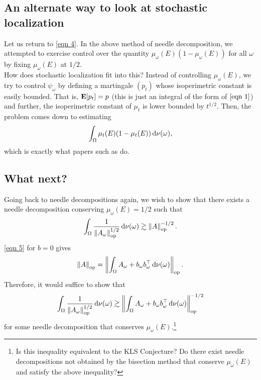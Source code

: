 \documentclass{article}
\begin{document}
	\subsection{An alternate way to look at stochastic localization}

		Let us return to \eqref{eqn 4}. In the above method of needle decomposition, we attempted to exercise control over the quantity $\mu_\omega(E) ( 1 - \mu_\omega(E) )$ for all $\omega$ by fixing $\mu_\omega(E)$ at $1/2$.\\

		How does stochastic localization fit into this? Instead of controlling $\mu_\omega(E)$, we try to control $\psi_\omega$ by defining a martingale $(p_t)$ whose isoperimetric constant is easily bounded. That is, $\textbf{E}[p_t] = p$ (this is just an integral of the form of $\eqref{eqn 1}$) and further, the isoperimetric constant of $\mu_t$ is lower bounded by $t^{1/2}$. Then, the problem comes down to estimating
		\[ \int_\Omega \mu_t(E) ( 1 - \mu_t(E) ) \operatorname{d}\!{\nu(\omega)}, \]
	which is exactly what papers such as \cite{chen2021constant} do.

	\subsection{What next?}

		Going back to needle decompositions again, we wish to show that there exists a needle decomposition conserving $\mu_\omega(E) = 1/2$ such that
		\[ \int_{\Omega} \frac{1}{\left\lVert A_\omega\right\rVert_{\text{op}}^{1/2}} \operatorname{d}\!{\nu(\omega)} \gtrsim \left\lVert A\right\rVert_{\text{op}}^{-1/2}. \]
		\eqref{eqn 5} for $b = 0$ gives
		\[ \left\lVert A\right\rVert_{\text{op}} = \left\lVert\int_{\Omega} A_\omega + b_\omega b_\omega^\top \operatorname{d}\!{\nu(\omega)} \right\rVert_{\text{op}}. \]
		Therefore, it would suffice to show that
		\[ \int_\Omega \frac{1}{\left\lVert A_\omega\right\rVert_{\text{op}}^{1/2}} \operatorname{d}\!{\nu(\omega)} \gtrsim \left\lVert\int_{\Omega} A_\omega + b_\omega b_\omega^\top \operatorname{d}\!{\nu(\omega)} \right\rVert_{\text{op}}^{-1/2} \]
		for some needle decomposition that conserves $\mu_\omega(E)$.\footnote{Is this inequality equivalent to the KLS Conjecture? Do there exist needle decompositions not obtained by the bisection method that conserve $\mu_\omega(E)$ and satisfy the above inequality?}\\
\end{document}
